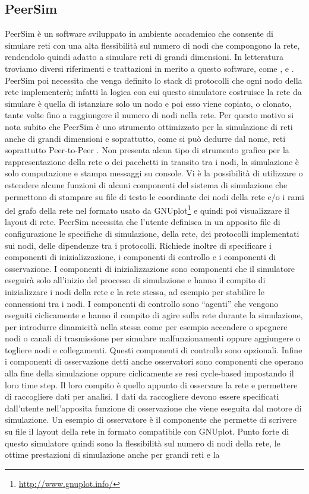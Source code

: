 \subsection{PeerSim}
PeerSim è un software sviluppato in ambiente accademico che consente di simulare reti con una alta flessibilità sul numero di nodi che compongono la rete, rendendolo quindi adatto a simulare reti di grandi dimensioni. In letteratura troviamo diversi riferimenti e trattazioni in merito a questo software, come \cite{montresor2010-peersim}, \cite{montresor2009-peersim_scalabile} e \cite{montresor2009-peersimP2P}. PeerSim poi necessita che venga definito lo stack di protocolli che ogni nodo della rete implementerà; infatti la logica con cui questo simulatore costruisce la rete da simulare è quella di istanziare solo un nodo e poi esso viene copiato, o clonato, tante volte fino a raggiungere il numero di nodi nella rete. Per questo motivo si nota subito  che PeerSim è uno strumento ottimizzato per la simulazione di reti anche di grandi dimensioni e soprattutto, come si può dedurre dal nome, reti soprattutto Peer-to-Peer \cite{montresor2009-peersimP2P}. Non presenta alcun tipo di strumento grafico per la rappresentazione della rete o dei pacchetti in transito tra i nodi, la simulazione è solo computazione e stampa messaggi su console. Vi è la possibilità di utilizzare o estendere alcune funzioni di alcuni componenti del sistema di simulazione che permettono di stampare su file di testo le coordinate dei nodi della rete e/o i rami del grafo della rete nel formato usato da GNUplot\footnote{\url{http://www.gnuplot.info/}} e quindi poi visualizzare il layout di rete. PeerSim necessita che l’utente definisca in un apposito file di configurazione le specifiche di simulazione, della rete, dei protocolli implementati sui nodi, delle dipendenze tra i protocolli. Richiede inoltre di specificare i componenti di inizializzazione, i componenti di controllo e i componenti di osservazione. I componenti di inizializzazione sono componenti che il simulatore eseguirà solo all’inizio del processo di simulazione e hanno il compito di inizializzare i nodi della rete e la rete stessa, ad esempio per stabilire le connessioni tra i nodi. I componenti di controllo sono “agenti” che vengono eseguiti ciclicamente e hanno il compito di agire sulla rete durante la simulazione, per introdurre dinamicità nella stessa come per esempio accendere o spegnere nodi o canali di trasmissione per simulare malfunzionamenti oppure aggiungere o togliere nodi e collegamenti. Questi componenti di controllo sono opzionali. Infine i componenti di osservazione detti anche osservatori sono componenti che operano alla fine della simulazione oppure ciclicamente se resi cycle-based impostando il loro time step. Il loro compito è quello appunto di osservare la rete e permettere di raccogliere dati per analisi. I dati da raccogliere devono essere specificati dall’utente nell’apposita funzione di osservazione che viene eseguita dal motore di simulazione. Un esempio di osservatore è il componente che permette di scrivere su file il layout della rete in formato compatibile con GNUplot. Punto forte di questo simulatore quindi sono la flessibilità sul numero di nodi della rete, le ottime prestazioni di simulazione anche per grandi reti e la 